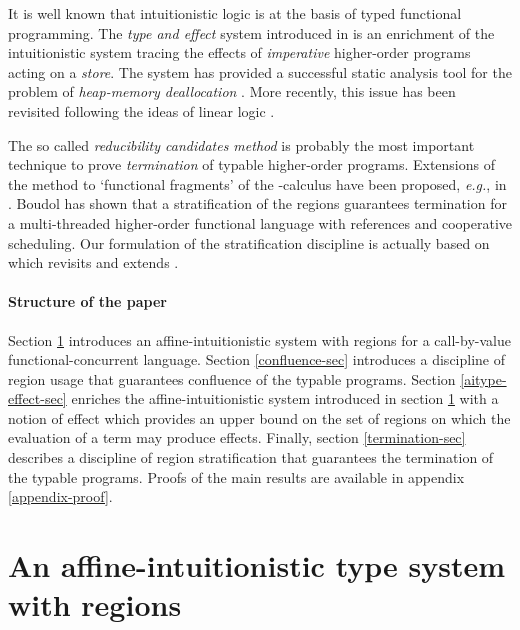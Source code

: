 \documentclass[11pt]{article}
\begin{document}
It is well known that intuitionistic logic is at the basis of typed
functional programming.  The {\em type and effect} system introduced
in \cite{LG88} is an enrichment of the intuitionistic system tracing
the effects of {\em imperative} higher-order programs acting on a {\em store}.  
The system has provided a successful static analysis tool
for the problem of {\em heap-memory deallocation} \cite{TT97}. 
More recently, this issue has been  revisited following the ideas of 
linear logic \cite{WW01,FMA06} .

The so called {\em reducibility candidates method} is probably the most
important technique to prove {\em termination} of typable higher-order
programs.  Extensions of the method to `functional fragments' of the
-calculus have been proposed, {\em e.g.}, in \cite{YBH04,S06}.
Boudol \cite{Boudol07} has shown that a stratification of the regions
guarantees termination for a multi-threaded higher-order functional language 
with references and cooperative scheduling. 
Our formulation of the stratification discipline is actually based on \cite{Amadio09} 
which revisits and extends \cite{Boudol07}.



\paragraph{Structure of the paper}
Section \ref{aitype-sec} introduces an affine-intuitionistic system with regions
for a call-by-value functional-concurrent language.
Section \ref{confluence-sec} introduces a discipline of region usage that guarantees
confluence of the typable programs.
Section \ref{aitype-effect-sec} enriches the affine-intuitionistic system introduced
in section \ref{aitype-sec} with a notion of effect which provides an upper bound
on the set of regions on which the evaluation of a term may produce effects.
Finally, section \ref{termination-sec} describes a discipline of region stratification
that guarantees the termination of the typable programs.
Proofs of the main results are available in appendix \ref{appendix-proof}.

\section{An affine-intuitionistic type system with regions}\label{aitype-sec}
\end{document}
